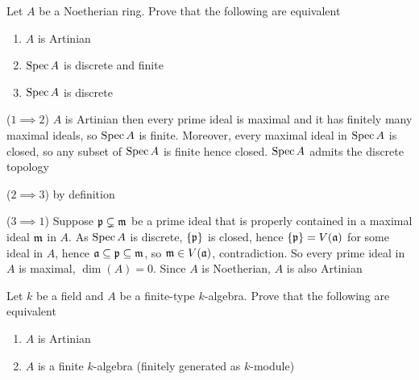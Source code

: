 \begin{problem}
	Let $A$ be a Noetherian ring. Prove that the following are equivalent
	\begin{enumerate}
		\item $A$ is Artinian
		\item $\operatorname{Spec} A$ is discrete and finite
		\item $\operatorname{Spec} A$ is discrete
	\end{enumerate}
\end{problem}

\begin{longproof}
	($1 \implies 2$) $A$ is Artinian then every prime ideal is maximal and it has finitely many maximal ideals, so $\operatorname{Spec} A$ is finite. Moreover, every maximal ideal in $\operatorname{Spec} A$ is closed, so any subset of $\operatorname{Spec} A$ is finite hence closed. $\operatorname{Spec} A$ admits the discrete topology
	
	($2 \implies 3$) by definition
	
	($3 \implies 1$) Suppose $\mathfrak{p} \subsetneq \mathfrak{m}$ be a prime ideal that is properly contained in a maximal ideal $\mathfrak{m}$ in $A$. As $\operatorname{Spec} A$ is discrete, $\{\mathfrak{p}\}$ is closed, hence $\{\mathfrak{p}\} = V(\mathfrak{a})$ for some ideal in $A$, hence $\mathfrak{a} \subseteq \mathfrak{p} \subseteq \mathfrak{m}$, so $\mathfrak{m} \in V(\mathfrak{a})$, contradiction. So every prime ideal in $A$ is maximal, $\dim(A) = 0$. Since $A$ is Noetherian, $A$ is also Artinian
\end{longproof}

\begin{problem}
	Let $k$ be a field and $A$ be a finite-type $k$-algebra. Prove that the following are equivalent
	\begin{enumerate}
		\item $A$ is Artinian
		\item $A$ is a finite $k$-algebra (finitely generated as $k$-module)
	\end{enumerate}
\end{problem}


